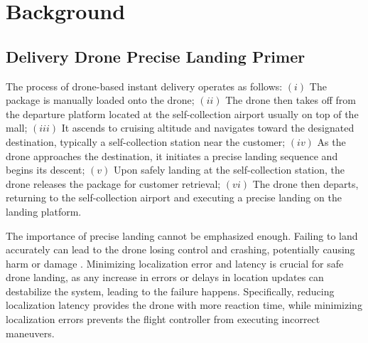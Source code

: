 \vspace{-0.3cm}
\section{Background}

\subsection{Delivery Drone Precise Landing Primer}
The process of drone-based instant delivery operates as follows:
$(i)$ The package is manually loaded onto the drone;
$(ii)$ The drone then takes off from the departure platform located at the self-collection airport usually on top of the mall;
$(iii)$ It ascends to cruising altitude and navigates toward the designated destination, typically a self-collection station near the customer;
$(iv)$ As the drone approaches the destination, it initiates a precise landing sequence and begins its descent;
$(v)$ Upon safely landing at the self-collection station, the drone releases the package for customer retrieval; 
$(vi)$ The drone then departs, returning to the self-collection airport and executing a precise landing on the landing platform.

The importance of precise landing cannot be emphasized enough. 
Failing to land accurately can lead to the drone losing control and crashing, potentially causing harm or damage \cite{Russiandrone}. 
Minimizing localization error and latency is crucial for safe drone landing, as any increase in errors or delays in location updates can destabilize the system, leading to the failure happens. 
Specifically, reducing localization latency provides the drone with more reaction time, while minimizing localization errors prevents the flight controller from executing incorrect maneuvers.


